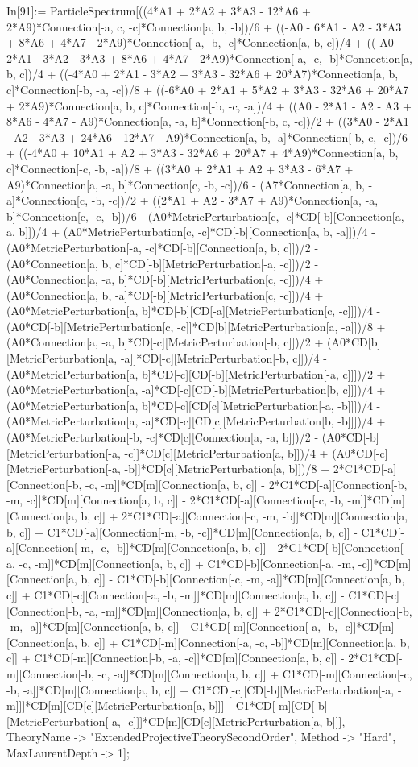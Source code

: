 In[91]:= ParticleSpectrum[((4*A1 + 2*A2 + 3*A3 - 12*A6 + 2*A9)*Connection[-a, c, -c]*Connection[a, b, -b])/6 + ((-A0 - 6*A1 - A2 - 3*A3 + 8*A6 + 4*A7 - 2*A9)*Connection[-a, -b, -c]*Connection[a, b, c])/4 + ((-A0 - 2*A1 - 3*A2 - 3*A3 + 8*A6 + 4*A7 - 2*A9)*Connection[-a, -c, -b]*Connection[a, b, c])/4 + ((-4*A0 + 2*A1 - 3*A2 + 3*A3 - 32*A6 + 20*A7)*Connection[a, b, c]*Connection[-b, -a, -c])/8 + ((-6*A0 + 2*A1 + 5*A2 + 3*A3 - 32*A6 + 20*A7 + 2*A9)*Connection[a, b, c]*Connection[-b, -c, -a])/4 + ((A0 - 2*A1 - A2 - A3 + 8*A6 - 4*A7 - A9)*Connection[a, -a, b]*Connection[-b, c, -c])/2 + ((3*A0 - 2*A1 - A2 - 3*A3 + 24*A6 - 12*A7 - A9)*Connection[a, b, -a]*Connection[-b, c, -c])/6 + ((-4*A0 + 10*A1 + A2 + 3*A3 - 32*A6 + 20*A7 + 4*A9)*Connection[a, b, c]*Connection[-c, -b, -a])/8 + ((3*A0 + 2*A1 + A2 + 3*A3 - 6*A7 + A9)*Connection[a, -a, b]*Connection[c, -b, -c])/6 - (A7*Connection[a, b, -a]*Connection[c, -b, -c])/2 + ((2*A1 + A2 - 3*A7 + A9)*Connection[a, -a, b]*Connection[c, -c, -b])/6 - (A0*MetricPerturbation[c, -c]*CD[-b][Connection[a, -a, b]])/4 + (A0*MetricPerturbation[c, -c]*CD[-b][Connection[a, b, -a]])/4 - (A0*MetricPerturbation[-a, -c]*CD[-b][Connection[a, b, c]])/2 - (A0*Connection[a, b, c]*CD[-b][MetricPerturbation[-a, -c]])/2 - (A0*Connection[a, -a, b]*CD[-b][MetricPerturbation[c, -c]])/4 + (A0*Connection[a, b, -a]*CD[-b][MetricPerturbation[c, -c]])/4 + (A0*MetricPerturbation[a, b]*CD[-b][CD[-a][MetricPerturbation[c, -c]]])/4 - (A0*CD[-b][MetricPerturbation[c, -c]]*CD[b][MetricPerturbation[a, -a]])/8 + (A0*Connection[a, -a, b]*CD[-c][MetricPerturbation[-b, c]])/2 + (A0*CD[b][MetricPerturbation[a, -a]]*CD[-c][MetricPerturbation[-b, c]])/4 - (A0*MetricPerturbation[a, b]*CD[-c][CD[-b][MetricPerturbation[-a, c]]])/2 + (A0*MetricPerturbation[a, -a]*CD[-c][CD[-b][MetricPerturbation[b, c]]])/4 + (A0*MetricPerturbation[a, b]*CD[-c][CD[c][MetricPerturbation[-a, -b]]])/4 - (A0*MetricPerturbation[a, -a]*CD[-c][CD[c][MetricPerturbation[b, -b]]])/4 + (A0*MetricPerturbation[-b, -c]*CD[c][Connection[a, -a, b]])/2 - (A0*CD[-b][MetricPerturbation[-a, -c]]*CD[c][MetricPerturbation[a, b]])/4 + (A0*CD[-c][MetricPerturbation[-a, -b]]*CD[c][MetricPerturbation[a, b]])/8 + 2*C1*CD[-a][Connection[-b, -c, -m]]*CD[m][Connection[a, b, c]] - 2*C1*CD[-a][Connection[-b, -m, -c]]*CD[m][Connection[a, b, c]] - 2*C1*CD[-a][Connection[-c, -b, -m]]*CD[m][Connection[a, b, c]] + 2*C1*CD[-a][Connection[-c, -m, -b]]*CD[m][Connection[a, b, c]] + C1*CD[-a][Connection[-m, -b, -c]]*CD[m][Connection[a, b, c]] - C1*CD[-a][Connection[-m, -c, -b]]*CD[m][Connection[a, b, c]] - 2*C1*CD[-b][Connection[-a, -c, -m]]*CD[m][Connection[a, b, c]] + C1*CD[-b][Connection[-a, -m, -c]]*CD[m][Connection[a, b, c]] - C1*CD[-b][Connection[-c, -m, -a]]*CD[m][Connection[a, b, c]] + C1*CD[-c][Connection[-a, -b, -m]]*CD[m][Connection[a, b, c]] - C1*CD[-c][Connection[-b, -a, -m]]*CD[m][Connection[a, b, c]] + 2*C1*CD[-c][Connection[-b, -m, -a]]*CD[m][Connection[a, b, c]] - C1*CD[-m][Connection[-a, -b, -c]]*CD[m][Connection[a, b, c]] + C1*CD[-m][Connection[-a, -c, -b]]*CD[m][Connection[a, b, c]] + C1*CD[-m][Connection[-b, -a, -c]]*CD[m][Connection[a, b, c]] - 2*C1*CD[-m][Connection[-b, -c, -a]]*CD[m][Connection[a, b, c]] + C1*CD[-m][Connection[-c, -b, -a]]*CD[m][Connection[a, b, c]] + C1*CD[-c][CD[-b][MetricPerturbation[-a, -m]]]*CD[m][CD[c][MetricPerturbation[a, b]]] - C1*CD[-m][CD[-b][MetricPerturbation[-a, -c]]]*CD[m][CD[c][MetricPerturbation[a, b]]], TheoryName -> "ExtendedProjectiveTheorySecondOrder", Method -> "Hard", MaxLaurentDepth -> 1]; 